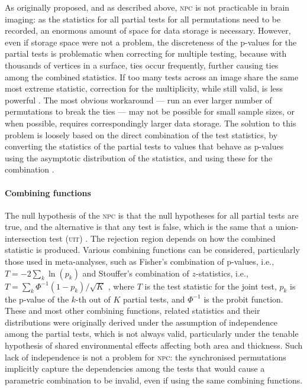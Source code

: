 As originally proposed, and as described above, \textsc{npc} is not practicable in brain imaging: as the statistics for all partial tests for all permutations need to be recorded, an enormous amount of space for data storage is necessary. However, even if storage space were not a problem, the discreteness of the p-values for the partial tests is problematic when correcting for multiple testing, because with thousands of vertices in a surface, ties occur frequently, further causing ties among the combined statistics. If too many tests across an image share the same most extreme statistic, correction for the multiplicity, while still valid, is less powerful \citep{Westfall1993, Pantazis2005}. The most obvious workaround --- run an ever larger number of permutations to break the ties --- may not be possible for small sample sizes, or when possible, requires correspondingly larger data storage. The solution to this problem is loosely based on the direct combination of the test statistics, by converting the statistics of the partial tests to values that behave as p-values using the asymptotic distribution of the statistics, and using these for the combination \citep{Winkler2016_npc}.

\paragraph{Combining functions}

The null hypothesis of the \textsc{npc} is that the null hypotheses for all partial tests are true, and the alternative is that any test is false, which is the same that a union-intersection test (\textsc{uit}) \citep{Roy1953}. The rejection region depends on how the combined statistic is produced. Various combining functions can be considered, particularly those used in meta-analyses, such as Fisher's combination of p-values, i.e., $T=-2\sum_k\ln(p_k)$ \citep{Fisher1932} and Stouffer's combination of $z$-statistics, i.e., $T = \sum_k \Phi^{-1}(1-p_k)/\sqrt{K}$ \citep{Stouffer1949}, where $T$ is the test statistic for the joint test, $p_k$ is the p-value of the $k$-th out of $K$ partial tests, and $\Phi^{-1}$ is the probit function. These and most other combining functions, related statistics and their distributions were originally derived under the assumption of independence among the partial tests, which is not always valid, particularly under the tenable hypothesis of shared environmental effects affecting both area and thickness. Such lack of independence is not a problem for \textsc{npc}: the synchronised permutations implicitly capture the dependencies among the tests that would cause a parametric combination to be invalid, even if using the same combining functions.

